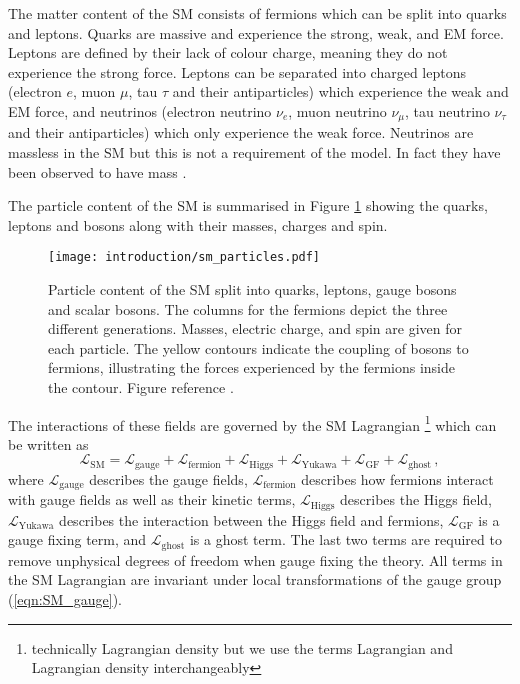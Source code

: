 \documentclass[main.tex]{subfiles}
\begin{document}
    The matter content of the SM consists of fermions which can be split
    into quarks and leptons. Quarks are massive and experience the strong,
    weak, and EM force. Leptons are defined by their lack of colour charge,
    meaning they do not experience the strong force. Leptons can be separated
    into charged leptons (electron $e$, muon $\mu$, tau $\tau$
    and their antiparticles) which experience the weak and EM force, and 
    neutrinos (electron neutrino $\nu_{e}$, muon neutrino $\nu_{\mu}$, tau
    neutrino $\nu_{\tau}$ and their antiparticles) which only experience the
    weak force. Neutrinos are massless in the SM but this is not a requirement
    of the model. In fact they have been observed to have mass \cite{Super-Kamiokande:1998kpq,SNO:2002tuh}.

    The particle content of the SM is summarised in Figure \ref{fig:SM_particles}
    showing the quarks, leptons and bosons along with their masses, charges
    and spin.
    \begin{figure}
        \texttt{[image: introduction/sm\_particles.pdf]}
        \caption{Particle content of the SM split into quarks, leptons,
        gauge bosons and scalar bosons. The columns for the fermions depict
        the three different generations. Masses, electric charge, and spin
        are given for each particle. The yellow contours indicate the coupling
        of bosons to fermions, illustrating the forces experienced by the
        fermions inside the contour. Figure reference \cite{SM_figure}.}
        \label{fig:SM_particles}
    \end{figure}
    The interactions of these fields are governed by the SM Lagrangian
    \footnote{technically Lagrangian density but we use the terms
    Lagrangian and Lagrangian density interchangeably}
    which can be written as
    \begin{equation}\label{eqn:L_SM}
        \mathcal{L}_{\mathrm{SM}} = \mathcal{L}_{\mathrm{gauge}} + \mathcal{L}_{\mathrm{fermion}} + \mathcal{L}_{\mathrm{Higgs}} + \mathcal{L}_{\mathrm{Yukawa}} + \mathcal{L}_{\mathrm{GF}} + \mathcal{L}_{\mathrm{ghost}} \, ,
    \end{equation}
    where $\mathcal{L}_{\mathrm{gauge}}$ describes the gauge fields,
    $\mathcal{L}_{\mathrm{fermion}}$ describes how fermions interact with
    gauge fields as well as their kinetic terms,
    $\mathcal{L}_{\mathrm{Higgs}}$ describes the Higgs field,
    $\mathcal{L}_{\mathrm{Yukawa}}$ describes the interaction between the Higgs
    field and fermions,
    $\mathcal{L}_{\mathrm{GF}}$ is a gauge fixing term,
    and $\mathcal{L}_{\mathrm{ghost}}$ is a ghost term.
    The last two terms are required to remove unphysical degrees of freedom
    when gauge fixing the theory.
    All terms in the SM Lagrangian are invariant under local transformations
    of the gauge group (\ref{eqn:SM_gauge}).
\end{document}
